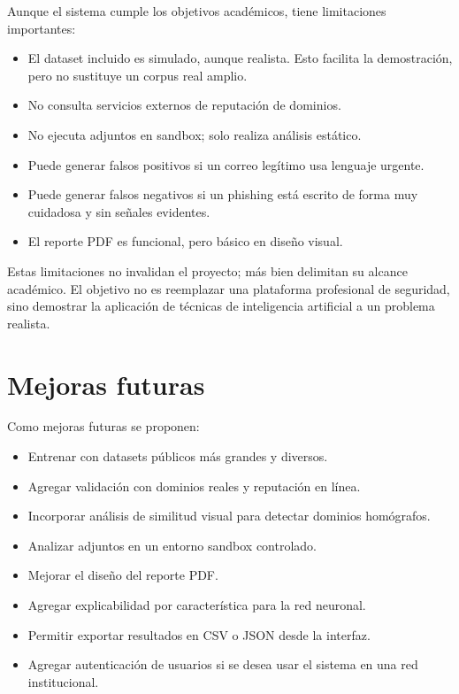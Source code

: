 \documentclass[12pt,letterpaper]{article}
\begin{document}
Aunque el sistema cumple los objetivos académicos, tiene limitaciones importantes:

\begin{itemize}
    \item El dataset incluido es simulado, aunque realista. Esto facilita la demostración, pero no sustituye un corpus real amplio.
    \item No consulta servicios externos de reputación de dominios.
    \item No ejecuta adjuntos en sandbox; solo realiza análisis estático.
    \item Puede generar falsos positivos si un correo legítimo usa lenguaje urgente.
    \item Puede generar falsos negativos si un phishing está escrito de forma muy cuidadosa y sin señales evidentes.
    \item El reporte PDF es funcional, pero básico en diseño visual.
\end{itemize}

Estas limitaciones no invalidan el proyecto; más bien delimitan su alcance académico. El objetivo no es reemplazar una plataforma profesional de seguridad, sino demostrar la aplicación de técnicas de inteligencia artificial a un problema realista.

\section{Mejoras futuras}

Como mejoras futuras se proponen:

\begin{itemize}
    \item Entrenar con datasets públicos más grandes y diversos.
    \item Agregar validación con dominios reales y reputación en línea.
    \item Incorporar análisis de similitud visual para detectar dominios homógrafos.
    \item Analizar adjuntos en un entorno sandbox controlado.
    \item Mejorar el diseño del reporte PDF.
    \item Agregar explicabilidad por característica para la red neuronal.
    \item Permitir exportar resultados en CSV o JSON desde la interfaz.
    \item Agregar autenticación de usuarios si se desea usar el sistema en una red institucional.
\end{itemize}
\end{document}
